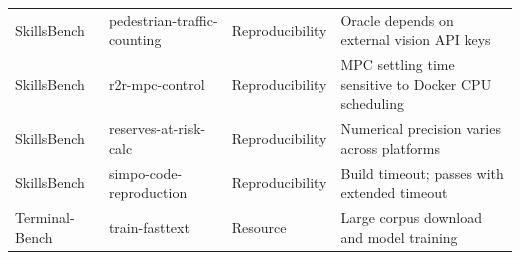 {\begin{tabular}{llll}
  SkillsBench & pedestrian-traffic-counting     & Reproducibility & Oracle depends on external vision API keys \\
  SkillsBench & r2r-mpc-control                 & Reproducibility & MPC settling time sensitive to Docker CPU scheduling \\
  SkillsBench & reserves-at-risk-calc           & Reproducibility & Numerical precision varies across platforms \\
  SkillsBench & simpo-code-reproduction        & Reproducibility & Build timeout; passes with extended timeout \\
  \midrule
  Terminal-Bench & train-fasttext               & Resource      & Large corpus download and model training \\
  \bottomrule
\end{tabular}%
}
